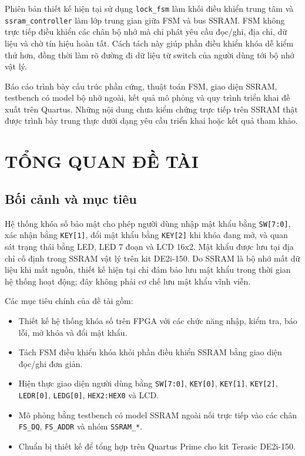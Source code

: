 \documentclass[13pt,a4paper]{article}
\begin{document}
Phiên bản thiết kế hiện tại sử dụng \texttt{lock\_fsm} làm khối điều khiển trung tâm và \texttt{ssram\_controller} làm lớp trung gian giữa FSM và bus SSRAM. FSM không trực tiếp điều khiển các chân bộ nhớ mà chỉ phát yêu cầu đọc/ghi, địa chỉ, dữ liệu và chờ tín hiệu hoàn tất. Cách tách này giúp phần điều khiển khóa dễ kiểm thử hơn, đồng thời làm rõ đường đi dữ liệu từ switch của người dùng tới bộ nhớ vật lý.

Báo cáo trình bày cấu trúc phần cứng, thuật toán FSM, giao diện SSRAM, testbench có model bộ nhớ ngoài, kết quả mô phỏng và quy trình triển khai đề xuất trên Quartus. Những nội dung chưa kiểm chứng trực tiếp trên SSRAM thật được trình bày trung thực dưới dạng yêu cầu triển khai hoặc kết quả tham khảo.

\newpage
\tableofcontents
\newpage
\listoffigures
{}
\newpage
\listoftables
{}
\newpage
{}

\section{TỔNG QUAN ĐỀ TÀI}
\subsection{Bối cảnh và mục tiêu}
Hệ thống khóa số bảo mật cho phép người dùng nhập mật khẩu bằng \texttt{SW[7:0]}, xác nhận bằng \texttt{KEY[1]}, đổi mật khẩu bằng \texttt{KEY[2]} khi khóa đang mở, và quan sát trạng thái bằng LED, LED 7 đoạn và LCD 16x2. Mật khẩu được lưu tại địa chỉ cố định trong SSRAM vật lý trên kit DE2i-150. Do SSRAM là bộ nhớ mất dữ liệu khi mất nguồn, thiết kế hiện tại chỉ đảm bảo lưu mật khẩu trong thời gian hệ thống hoạt động; đây không phải cơ chế lưu mật khẩu vĩnh viễn.

Các mục tiêu chính của đề tài gồm:
\begin{itemize}
  \item Thiết kế hệ thống khóa số trên FPGA với các chức năng nhập, kiểm tra, báo lỗi, mở khóa và đổi mật khẩu.
  \item Tách FSM điều khiển khóa khỏi phần điều khiển SSRAM bằng giao diện đọc/ghi đơn giản.
  \item Hiện thực giao diện người dùng bằng \texttt{SW[7:0]}, \texttt{KEY[0]}, \texttt{KEY[1]}, \texttt{KEY[2]}, \texttt{LEDR[0]}, \texttt{LEDG[0]}, \texttt{HEX2:HEX0} và LCD.
  \item Mô phỏng bằng testbench có model SSRAM ngoài nối trực tiếp vào các chân \texttt{FS\_DQ}, \texttt{FS\_ADDR} và nhóm \texttt{SSRAM\_*}.
  \item Chuẩn bị thiết kế để tổng hợp trên Quartus Prime cho kit Terasic DE2i-150.
\end{itemize}
\end{document}
